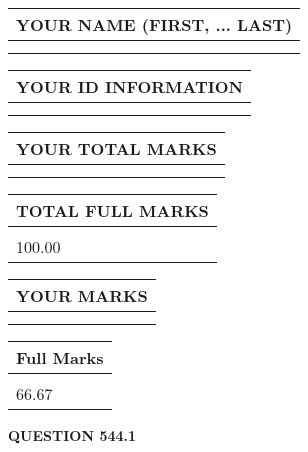 \documentclass{ctexart}
\begin{document}
   
   
   
\newpage 
\setcounter{page}{ 
   544001 } 
   
   
   
   
\noindent\begin{tabular}{|l|}
\hline
YOUR NAME (FIRST, ... LAST)  \\
\hline
 \\ 
 \\ 
\hline
\end{tabular}
\hspace{0.05in} \begin{tabular}{|l|}
\hline
 YOUR   ID   INFORMATION  \\
\hline
 \\ 
 \\ 
\hline
\end{tabular}
   
   
\vspace{0.2in}\noindent\begin{tabular}{|l|}
\hline
YOUR TOTAL MARKS  \\
\hline
 \\ 
 \\ 
\hline
\end{tabular}
\hspace{0.05in} \begin{tabular}{|l|}
\hline
TOTAL FULL MARKS  \\
\hline
 \\ 
100.00 \\
\hline
\end{tabular}
   
   
 \vspace{0.2in}
 
 
 
 
   
   
  
\vspace{0.2in}
  
\noindent\begin{tabular}{|l|}
\hline
 YOUR MARKS  \\
\hline
 \\ 
 \\ 
\hline
\end{tabular}
\hspace{0.05in} \begin{tabular}{|l|}
\hline
 Full Marks  \\
\hline
 \\ 
66.67 \\
\hline
\end{tabular}
{\textbf{\Large{QUESTION
544.1 
}}}
  
\end{document}

